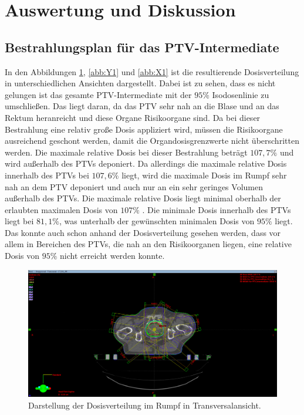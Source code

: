 \section{Auswertung und Diskussion}
\label{sec:AuswertungDiskussion}

\subsection*{Bestrahlungsplan für das PTV-Intermediate}

In den Abbildungen \ref{abb:Z1}, \ref{abb:Y1} und \ref{abb:X1} ist die resultierende Dosisverteilung
in unterschiedlichen Ansichten dargestellt. Dabei ist
zu sehen, dass es nicht gelungen ist das gesamte PTV-Intermediate mit der $95\%$ Isodosenlinie zu umschließen.
Das liegt daran, da das PTV sehr nah an die Blase und an das Rektum heranreicht und diese Organe Risikoorgane sind.
Da bei dieser Bestrahlung eine relativ große Dosis appliziert wird, müssen die Risikoorgane ausreichend geschont werden, damit die
Organdosisgrenzwerte nicht überschritten werden. Die maximale relative Dosis bei dieser Bestrahlung beträgt $107,7\%$ und wird außerhalb des PTVs
deponiert. Da allerdings die maximale relative Dosis innerhalb des PTVs bei $107,6\%$ liegt, wird die maximale Dosis im Rumpf sehr nah an dem PTV deponiert
und auch nur an ein sehr geringes Volumen außerhalb des PTVs. Die maximale relative Dosis liegt minimal oberhalb der erlaubten maximalen Dosis von
$107\%$ \cite{ICRU}. Die minimale Dosis innerhalb des PTVs liegt bei $81,1\%$, was unterhalb der gewünschten minimalen Dosis von $95\%$ liegt.
Das konnte auch schon anhand der Dosisverteilung gesehen werden, dass vor allem in Bereichen des PTVs, die nah an den Risikoorganen
liegen, eine relative Dosis von $95\%$ nicht erreicht werden konnte.


\begin{figure}[H]
  \centering
  \includegraphics[width=\textwidth]{Bilder/Prostata1_Z.png}
  \caption{Darstellung der Dosisverteilung im Rumpf in Transversalansicht.}
  \label{abb:Z1}
\end{figure}

